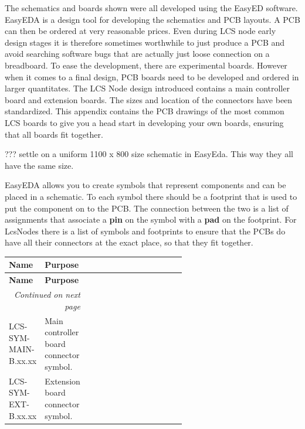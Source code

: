 
The schematics and boards shown were all developed using the EasyED software. EasyEDA is a design tool for developing the schematics and PCB layouts. A PCB can then be ordered at very reasonable prices. Even during LCS node early design stages it is therefore sometimes worthwhile to just produce a PCB and avoid searching software bugs that are actually just loose connection on a breadboard. To ease the development, there are experimental boards. However when it comes to a final design, PCB boards need to be developed and ordered in larger quantitates. The LCS Node design introduced contains a main controller board and extension boards. The sizes and location of the connectors have been standardized. This appendix contains the PCB drawings of the most common LCS boards to give you a head start in developing your own boards, ensuring that all boards fit together.


??? settle on a uniform 1100 x 800 size schematic in EasyEda. This way they all have the same size.



EasyEDA allows you to create symbols that represent components and can be placed in a schematic. To each symbol there should be a footprint that is used to put the component on to the PCB. The connection between the two is a list of assignments that associate a \textbf{pin} on the symbol with a \textbf{pad} on the footprint. For LcsNodes there is a list of symbols and footprints to ensure that the PCBs do have all their connectors at the exact place, so that they fit together.

\begin{longtable}{@{}|l|l|p{0.6\linewidth}|@{}}
    \toprule
    \textbf{Name} & \textbf{Purpose} \\
    \midrule
    \endfirsthead
    \toprule
    \textbf{Name} & \textbf{Purpose} \\
    \midrule
    \endhead
    \midrule
    \multicolumn{2}{r}{\textit{Continued on next page}} \\
    \midrule
    \endfoot
    \bottomrule
    \endlastfoot
    LCS-SYM-MAIN-B.xx.xx & Main controller board connector symbol. \\
    \midrule
    LCS-SYM-EXT-B.xx.xx & Extension board connector symbol. \\
    \midrule
\end{longtable}



